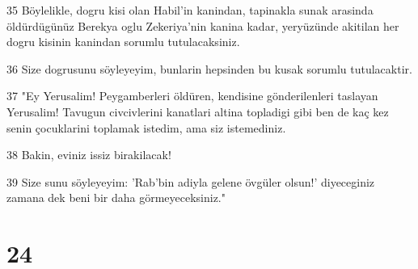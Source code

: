 \par 35 Böylelikle, dogru kisi olan Habil'in kanindan, tapinakla sunak arasinda öldürdügünüz Berekya oglu Zekeriya'nin kanina kadar, yeryüzünde akitilan her dogru kisinin kanindan sorumlu tutulacaksiniz.
\par 36 Size dogrusunu söyleyeyim, bunlarin hepsinden bu kusak sorumlu tutulacaktir.
\par 37 "Ey Yerusalim! Peygamberleri öldüren, kendisine gönderilenleri taslayan Yerusalim! Tavugun civcivlerini kanatlari altina topladigi gibi ben de kaç kez senin çocuklarini toplamak istedim, ama siz istemediniz.
\par 38 Bakin, eviniz issiz birakilacak!
\par 39 Size sunu söyleyeyim: 'Rab'bin adiyla gelene övgüler olsun!' diyeceginiz zamana dek beni bir daha görmeyeceksiniz."

\chapter{24}

